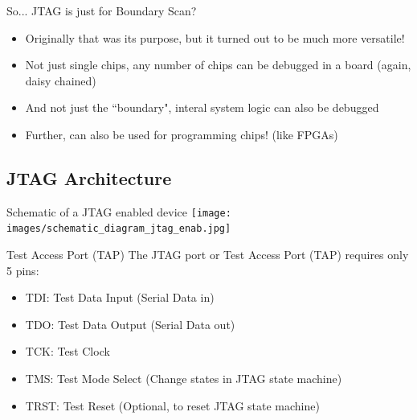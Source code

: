 \documentclass{beamer}
\begin{document}
\begin{frame}{So... JTAG is just for Boundary Scan?}
    \begin{itemize}
    \item Originally that was its purpose, but it turned out to be much more versatile!
    \item Not just single chips, any number of chips can be debugged in a board
        (again, daisy chained)
    \item And not just the ``boundary", interal system logic can also be debugged
    \item Further, can also be used for programming chips! (like FPGAs)
    \end{itemize}
\end{frame}

\subsection{JTAG Architecture}

\begin{frame}{Schematic of a JTAG enabled device}
    \texttt{[image: images/schematic\_diagram\_jtag\_enab.jpg]}
\end{frame}

\begin{frame}{Test Access Port (TAP)}
The JTAG port or Test Access Port (TAP) requires only 5 pins:
    \begin{itemize}
    \item TDI: Test Data Input (Serial Data in) 
    \item TDO: Test Data Output (Serial Data out)
    \item TCK: Test Clock
    \item TMS: Test Mode Select (Change states in JTAG state machine)
    \item TRST: Test Reset (Optional, to reset JTAG state machine)
    \end{itemize}
\end{frame}
\end{document}
